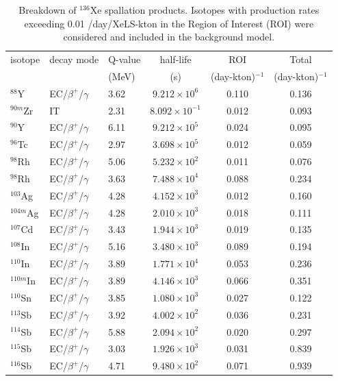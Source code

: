 \begin{table}[ht]
\centering
\caption{Breakdown of $^{136}$Xe spallation products. Isotopes with production rates exceeding 0.01 /day/XeLS-kton in the Region of Interest (ROI) were considered and included in the background model.}
\label{tab:xenon_spallation_products}
\begin{tabular}{lllccc}
\hline
isotope & decay mode & Q-value & half-life & ROI & Total \\
 & & (MeV) & (s) & (day-kton)$^{-1}$ & (day-kton)$^{-1}$ \\
\hline
$^{88}$Y & EC/$\beta^+$/$\gamma$ & 3.62 & $9.212 \times 10^6$ & 0.110 & 0.136 \\
$^{90m}$Zr & IT & 2.31 & $8.092 \times 10^{-1}$ & 0.012 & 0.093 \\
$^{90}$Y & EC/$\beta^+$/$\gamma$ & 6.11 & $9.212 \times 10^5$ & 0.024 & 0.095 \\
$^{96}$Tc & EC/$\beta^+$/$\gamma$ & 2.97 & $3.698 \times 10^5$ & 0.012 & 0.059 \\
$^{98}$Rh & EC/$\beta^+$/$\gamma$ & 5.06 & $5.232 \times 10^2$ & 0.011 & 0.076 \\
$^{98}$Rh & EC/$\beta^+$/$\gamma$ & 3.63 & $7.488 \times 10^4$ & 0.088 & 0.234 \\
$^{103}$Ag & EC/$\beta^+$/$\gamma$ & 4.28 & $4.152 \times 10^3$ & 0.012 & 0.160 \\
$^{104m}$Ag & EC/$\beta^+$/$\gamma$ & 4.28 & $2.010 \times 10^3$ & 0.018 & 0.111 \\
$^{107}$Cd & EC/$\beta^+$/$\gamma$ & 3.43 & $1.944 \times 10^3$ & 0.019 & 0.135 \\
$^{108}$In & EC/$\beta^+$/$\gamma$ & 5.16 & $3.480 \times 10^3$ & 0.089 & 0.194 \\
$^{110}$In & EC/$\beta^+$/$\gamma$ & 3.89 & $1.771 \times 10^4$ & 0.053 & 0.236 \\
$^{110m}$In & EC/$\beta^+$/$\gamma$ & 3.89 & $4.146 \times 10^3$ & 0.066 & 0.351 \\
$^{110}$Sn & EC/$\beta^+$/$\gamma$ & 3.85 & $1.080 \times 10^3$ & 0.027 & 0.122 \\
$^{113}$Sb & EC/$\beta^+$/$\gamma$ & 3.92 & $4.002 \times 10^2$ & 0.036 & 0.231 \\
$^{114}$Sb & EC/$\beta^+$/$\gamma$ & 5.88 & $2.094 \times 10^2$ & 0.020 & 0.297 \\
$^{115}$Sb & EC/$\beta^+$/$\gamma$ & 3.03 & $1.926 \times 10^3$ & 0.031 & 0.839 \\
$^{116}$Sb & EC/$\beta^+$/$\gamma$ & 4.71 & $9.480 \times 10^2$ & 0.071 & 0.939 \\

\end{tabular}
\end{table}
